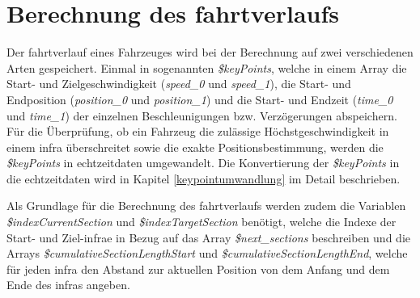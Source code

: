 \section{Berechnung des \Gls{fahrtverlauf}s} \label{kapitelFahrtverlauf}
Der \Gls{fahrtverlauf} eines Fahrzeuges wird bei der Berechnung auf zwei verschiedenen Arten gespeichert. Einmal in sogenannten \textit{\$keyPoints}, welche in einem Array die Start- und Zielgeschwindigkeit (\textit{speed\_0} und \textit{speed\_1}), die Start- und Endposition (\textit{po\-si\-tion\_0} und \textit{position\_1}) und die Start- und Endzeit (\textit{time\_0} und \textit{time\_1}) der einzelnen Beschleunigungen bzw. Verzögerungen abspeichern. Für die Überprüfung, ob ein Fahrzeug die zulässige Höchstgeschwindigkeit in einem \ac{infra} überschreitet sowie die exakte Positionsbestimmung, werden die \textit{\$keyPoints} in \Gls{echtzeitdaten} umgewandelt. Die Konvertierung der \textit{\$keyPoints} in die \Gls{echtzeitdaten} wird in Kapitel \ref{keypointumwandlung} im Detail beschrieben.

Als Grundlage für die Berechnung des \Gls{fahrtverlauf}s werden zudem die Variablen \textit{\$indexCurrentSection} und \textit{\$indexTargetSection} benötigt, welche die Indexe der Start- und Ziel-\ac{infra}e in Bezug auf das Array \textit{\$next\_sections} beschreiben und die Arrays \textit{\$cumulativeSectionLengthStart} und \textit{\$cumulativeSectionLengthEnd}, welche für jeden \ac{infra} den Abstand zur aktuellen Position von dem Anfang und dem Ende des \ac{infra}s angeben.

